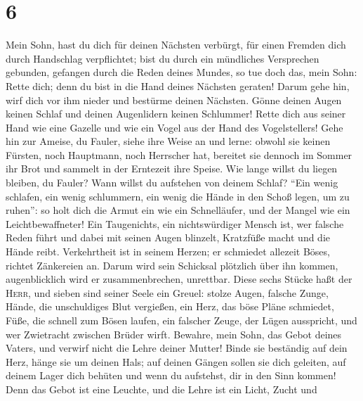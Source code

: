 \hypertarget{section-5}{%
\section{6}\label{section-5}}

 Mein Sohn, hast du dich für deinen Nächsten verbürgt, für
einen Fremden dich durch Handschlag verpflichtet;  bist du
durch ein mündliches Versprechen gebunden, gefangen durch die Reden
deines Mundes,  so tue doch das, mein Sohn: Rette dich;
denn du bist in die Hand deines Nächsten geraten! Darum gehe hin, wirf
dich vor ihm nieder und bestürme deinen Nächsten.  Gönne
deinen Augen keinen Schlaf und deinen Augenlidern keinen Schlummer!
 Rette dich aus seiner Hand wie eine Gazelle und wie ein
Vogel aus der Hand des Vogelstellers!  Gehe hin zur
Ameise, du Fauler, siehe ihre Weise an und lerne:  obwohl
sie keinen Fürsten, noch Hauptmann, noch Herrscher hat, 
bereitet sie dennoch im Sommer ihr Brot und sammelt in der Erntezeit
ihre Speise.  Wie lange willst du liegen bleiben, du
Fauler? Wann willst du aufstehen von deinem Schlaf? 
``Ein wenig schlafen, ein wenig schlummern, ein wenig die Hände in den
Schoß legen, um zu ruhen'':  so holt dich die Armut ein
wie ein Schnelläufer, und der Mangel wie ein Leichtbewaffneter!
 Ein Taugenichts, ein nichtswürdiger Mensch ist, wer
falsche Reden führt  und dabei mit seinen Augen blinzelt,
Kratzfüße macht und die Hände reibt.  Verkehrtheit ist in
seinem Herzen; er schmiedet allezeit Böses, richtet Zänkereien an.
 Darum wird sein Schicksal plötzlich über ihn kommen,
augenblicklich wird er zusammenbrechen, unrettbar.  Diese
sechs Stücke haßt der \textsc{Herr}, und sieben sind seiner Seele ein
Greuel:  stolze Augen, falsche Zunge, Hände, die
unschuldiges Blut vergießen,  ein Herz, das böse Pläne
schmiedet, Füße, die schnell zum Bösen laufen,  ein
falscher Zeuge, der Lügen ausspricht, und wer Zwietracht zwischen Brüder
wirft.  Bewahre, mein Sohn, das Gebot deines Vaters, und
verwirf nicht die Lehre deiner Mutter!  Binde sie
beständig auf dein Herz, hänge sie um deinen Hals;  auf
deinen Gängen sollen sie dich geleiten, auf deinem Lager dich behüten
und wenn du aufstehst, dir in den Sinn kommen!  Denn das
Gebot ist eine Leuchte, und die Lehre ist ein Licht, Zucht und
